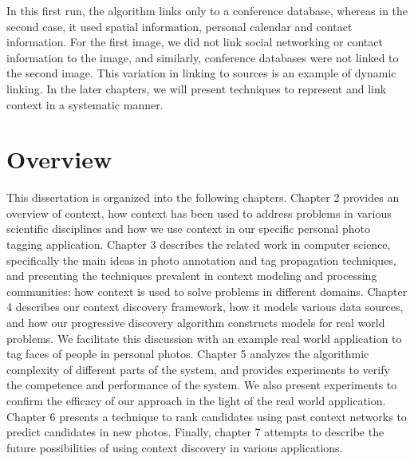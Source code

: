 In this first run, the algorithm links only to a conference database, whereas in the second case, it used spatial information, personal calendar and contact information. For the first image, we did not link social networking or contact information to the image, and similarly, conference databases were not linked to the second image. This variation in linking to sources is an example of dynamic linking. In the later chapters, we will present techniques to represent and link context in a systematic manner.

\section{Overview}
This dissertation is organized into the following chapters. Chapter 2 provides an overview of context, how context has been used to address problems in various scientific disciplines and how we use context in our specific personal photo tagging application. Chapter 3 describes the related work in computer science, specifically the main ideas in photo annotation and tag propagation techniques, and presenting the techniques prevalent in context modeling and processing communities: how context is used to solve problems in different domains. Chapter 4 describes our context discovery framework, how it models various data sources, and how our progressive discovery algorithm constructs models for real world problems. We facilitate this discussion with an example real world application to tag faces of people in personal photos. Chapter 5 analyzes the algorithmic complexity of different parts of the system, and provides experiments to verify the competence and performance of the system. We also present experiments to confirm the efficacy of our approach in the light of the real world application. Chapter 6 presents a technique to rank candidates using past context networks to predict candidates in new photos. Finally, chapter 7 attempts to describe the future possibilities of using context discovery in various applications.



